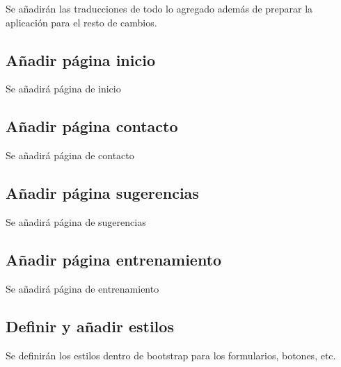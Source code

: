 Se añadirán las traducciones de todo lo agregado además de preparar la aplicación
para el resto de cambios.

\subsection{Añadir página inicio}

Se añadirá página de inicio

\subsection{Añadir página contacto}

Se añadirá página de contacto

\subsection{Añadir página sugerencias}

Se añadirá página de sugerencias

\subsection{Añadir página entrenamiento}

Se añadirá página de entrenamiento

\subsection{Definir y añadir estilos}

Se definirán los estilos dentro de bootstrap para los formularios, botones, etc.
